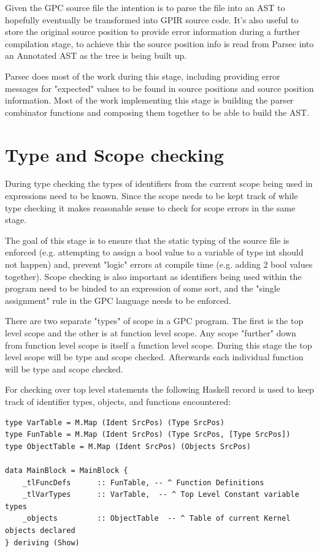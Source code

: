 Given the GPC source file the intention is to parse the file into an AST
to hopefully eventually be transformed into GPIR source code. It's
also useful to store the original source position to provide error information 
during a further compilation stage, to achieve this the source position
info is read from Parsec into an Annotated AST as the tree is being built up.

Parsec does most of the work during this stage, including
providing error messages for "expected" values to be found in source
positions and source position information. Most of the work implementing
this stage is building the parser combinator functions and composing
them together to be able to build the AST.


\section{Type and Scope checking}
\label{sec:type}
During type checking the types of identifiers from the current scope being used in expressions need
to be known. Since the scope needs to be kept track of while type checking it makes reasonable
sense to check for scope errors in the same stage.

The goal of this stage is to ensure that the static typing of the source file
is enforced (e.g. attempting to assign a bool value to a variable of type int should not happen) and,
prevent "logic" errors at compile time (e.g. adding 2 bool values together). Scope checking
is also important as identifiers being used within the program need to be binded to an expression of
some sort, and the "single assignment" rule in the GPC language needs to be enforced.

There are two separate "types" of scope in a GPC program. The first is the top level scope and the
other is at function level scope. Any scope "further" down from function level scope is itself
a function level scope. During this stage the top level scope will be type and scope checked.
Afterwards each individual function will be type and scope checked.

For checking over top level statements the following Haskell record is used
to keep track of identifier types, objects, and functions encountered:

\begin{lstlisting}[style=myHaskell]
type VarTable = M.Map (Ident SrcPos) (Type SrcPos)
type FunTable = M.Map (Ident SrcPos) (Type SrcPos, [Type SrcPos])
type ObjectTable = M.Map (Ident SrcPos) (Objects SrcPos)

data MainBlock = MainBlock {
    _tlFuncDefs      :: FunTable, -- ^ Function Definitions
    _tlVarTypes      :: VarTable,  -- ^ Top Level Constant variable types
    _objects         :: ObjectTable  -- ^ Table of current Kernel objects declared 
} deriving (Show)
\end{lstlisting}

